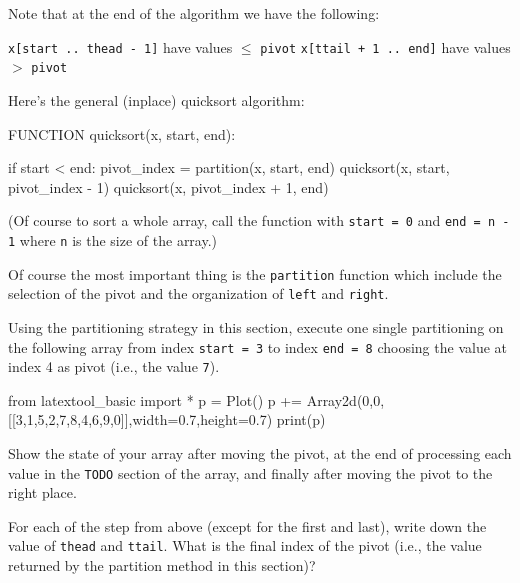 Note that at the end of the algorithm we have the following:
\begin{tightlist}
  \li \verb!x[start .. thead - 1]! have values $\leq$ \verb!pivot! 
  \li \verb!x[ttail + 1 .. end]! have values $>$ \verb!pivot!
\end{tightlist}

Here's the general (inplace) quicksort algorithm:
\begin{console}
FUNCTION quicksort(x, start, end):

    if start < end:
        pivot_index = partition(x, start, end)
        quicksort(x, start, pivot_index - 1)
        quicksort(x, pivot_index + 1, end)
\end{console}

(Of course to sort a whole array, call the function
with \verb!start = 0! and \verb!end = n - 1! where \verb!n!
is the size of the array.)

Of course the most important thing is the \verb!partition!
function which include the selection of the pivot and the
organization of \verb!left! and \verb!right!.





\newpage
\begin{ex}
\begin{tightlist}
\item Using the partitioning strategy in this section,
execute one single partitioning on the following array
from index \verb!start = 3! to index \verb!end = 8!
choosing the value at index 4 as pivot (i.e., the value \verb!7!).

\begin{python}
from latextool_basic import *
p = Plot()
p += Array2d(0,0,[[3,1,5,2,7,8,4,6,9,0]],width=0.7,height=0.7)
print(p)
\end{python}

Show the state of your array after moving the pivot, at the end of
processing each value in the \verb!TODO! section of the array,
and finally after moving the pivot to the right place.

\item For each of the step from above (except for the first and last),
write down the value of \verb!thead! and \verb!ttail!.
What is the final index of the pivot (i.e., the value returned
by the partition method in this section)? 
\end{tightlist}
\end{ex}



